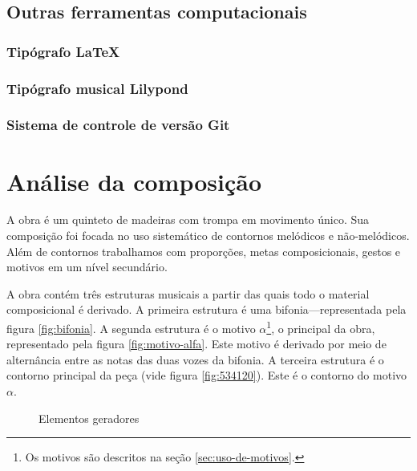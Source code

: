 \section{Outras ferramentas computacionais}
\label{sec:outr-ferr-comp}

\subsection{Tipógrafo \LaTeX{}}
\label{sec:latex}

\subsection{Tipógrafo musical Lilypond}
\label{sec:tipogr-music-lilyp}

\subsection{Sistema de controle de versão Git}
\label{sec:sistema-de-controle}

\chapter{Análise da composição}
\label{cha:anal-da-comp}

A obra \obra{} é um quinteto de madeiras com trompa em movimento
único. Sua composição foi focada no uso sistemático de contornos
melódicos e não-melódicos. Além de contornos trabalhamos com
proporções, metas composicionais, gestos e motivos em um nível
secundário.

A obra contém três estruturas musicais a partir das quais todo o
material composicional é derivado. A primeira estrutura é uma
bifonia---representada pela figura \ref{fig:bifonia}. A segunda
estrutura é o motivo $\alpha$\footnote{Os motivos são descritos na
  seção \ref{sec:uso-de-motivos}.}, o principal da obra, representado
pela figura \ref{fig:motivo-alfa}. Este motivo é derivado por meio de
alternância entre as notas das duas vozes da bifonia. A terceira
estrutura é o contorno principal da peça \contpr{} (vide figura
\ref{fig:534120}). Este é o contorno do motivo $\alpha$.

\begin{figure}
  \centering

  \caption{Elementos geradores}
  \label{fig:elementos-geradores}
\end{figure}

